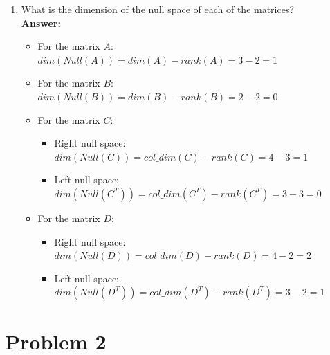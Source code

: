 \documentclass[letterpaper,11pt]{article}
\begin{document}
\begin{enumerate}
\begin{enumerate}
$$\begin{array}{c}
	v_{11}^2+v_{12}^2=1 \\
	v_{21}^2+v_{22}^2=1 \\
	\end{array}\right. \Rightarrow \left\{\begin{array}{c}
	v_{11}=\frac{\sqrt{5}}{5} \\
	v_{12}=\frac{2\sqrt{5}}{5} \\
	v_{21}=\frac{\sqrt{5}}{5} \\
	v_{22}=-\frac{2\sqrt{5}}{5} \\
	\end{array}\right.$$
	Therefore $B$'s eigenvector are $\vec{v}_1=\left[\frac{\sqrt(5)}{5},\frac{2\sqrt{5}}{5}\right]^T ,~\vec{v}_2=\left[\frac{\sqrt(5)}{5},-\frac{2\sqrt{5}}{5}\right]^T$
	\item What is the dimension of the null space of each of the matrices?\\
	\textbf{Answer:}
	\begin{itemize}
		\item For the matrix $A$: $dim(Null(A))=dim(A)-rank(A)=3-2=1$
		\item For the matrix $B$: $dim(Null(B))=dim(B)-rank(B)=2-2=0$
		\item For the matrix $C$:
		\begin{itemize}
			\item Right null space: $dim(Null(C))=col\_dim(C)-rank(C)=4-3=1$
			\item Left null space: $dim(Null(C^T))=col\_dim(C^T)-rank(C^T)=3-3=0$
		\end{itemize}
		\item For the matrix $D$:
		\begin{itemize}
			\item Right null space: $dim(Null(D))=col\_dim(D)-rank(D)=4-2=2$
			\item Left null space: $dim(Null(D^T))=col\_dim(D^T)-rank(D^T)=3-2=1$
		\end{itemize}
	\end{itemize}
\end{enumerate}
\end{enumerate}

\newpage

\section*{Problem 2}
\end{document}
